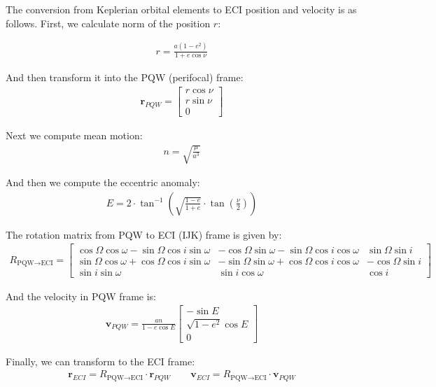 The conversion from Keplerian orbital elements to ECI position and velocity is as follows. First, we calculate norm of the position $r$:

\begin{align}
r = \frac{a(1 - e^2)}{1 + e \cos \nu}
\end{align}

And then transform it into the PQW (perifocal) frame:
\begin{align}
\mathbf{r}_{PQW} = \begin{bmatrix}
r \cos \nu \\
r \sin \nu \\
0
\end{bmatrix}
\end{align}

Next we compute mean motion:
\begin{align}
n = \sqrt{\frac{\mu}{a^3}}
\end{align}

And then we compute the eccentric anomaly:
\begin{align}
E = 2 \cdot \tan^{-1} \left( \sqrt{\frac{1 - e}{1 + e}} \cdot \tan\left(\frac{\nu}{2}\right) \right)
\end{align}

The rotation matrix from PQW to ECI (IJK) frame is given by:
\begin{align}
R_{\text{PQW} \to \text{ECI}} = 
\begin{bmatrix}
\cos\Omega\cos\omega - \sin\Omega\cos i\sin\omega & -\cos\Omega\sin\omega - \sin\Omega\cos i\cos\omega & \sin\Omega\sin i \\
\sin\Omega\cos\omega + \cos\Omega\cos i\sin\omega & -\sin\Omega\sin\omega + \cos\Omega\cos i\cos\omega & -\cos\Omega\sin i \\
\sin i\sin\omega & \sin i\cos\omega & \cos i
\end{bmatrix}
\end{align}

And the velocity in PQW frame is:
\begin{align}
\mathbf{v}_{PQW} = \frac{a n}{1 - e \cos E}
\begin{bmatrix}
-\sin E \\
\sqrt{1 - e^2} \cos E \\
0
\end{bmatrix}
\end{align}

Finally, we can transform to the ECI frame:
\begin{align}
\mathbf{r}_{ECI} = R_{\text{PQW} \to \text{ECI}} \cdot \mathbf{r}_{PQW}
\qquad
\mathbf{v}_{ECI} = R_{\text{PQW} \to \text{ECI}} \cdot \mathbf{v}_{PQW}
\end{align}


